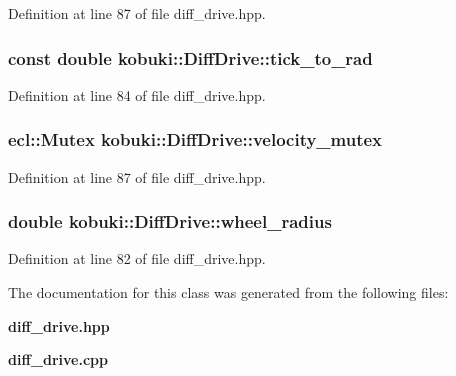 \-Definition at line 87 of file diff\-\_\-drive.\-hpp.

\subsubsection[{tick\-\_\-to\-\_\-rad}]{\setlength{\rightskip}{0pt plus 5cm}const double {\bf kobuki\-::\-Diff\-Drive\-::tick\-\_\-to\-\_\-rad}\hspace{0.3cm}{\ttfamily  [private]}}\label{classkobuki_1_1DiffDrive_ac61d00b9dfa7e395e42e8440124c0d46}


\-Definition at line 84 of file diff\-\_\-drive.\-hpp.

\subsubsection[{velocity\-\_\-mutex}]{\setlength{\rightskip}{0pt plus 5cm}ecl\-::\-Mutex {\bf kobuki\-::\-Diff\-Drive\-::velocity\-\_\-mutex}\hspace{0.3cm}{\ttfamily  [private]}}\label{classkobuki_1_1DiffDrive_a7f9245868c140c829a98d5a94ffbeb3b}


\-Definition at line 87 of file diff\-\_\-drive.\-hpp.

\subsubsection[{wheel\-\_\-radius}]{\setlength{\rightskip}{0pt plus 5cm}double {\bf kobuki\-::\-Diff\-Drive\-::wheel\-\_\-radius}\hspace{0.3cm}{\ttfamily  [private]}}\label{classkobuki_1_1DiffDrive_a8074f33732a3dd52f6ba2fc00223727d}


\-Definition at line 82 of file diff\-\_\-drive.\-hpp.



\-The documentation for this class was generated from the following files\-:\begin{DoxyCompactItemize}
\item 
{\bf diff\-\_\-drive.\-hpp}\item 
{\bf diff\-\_\-drive.\-cpp}\end{DoxyCompactItemize}
